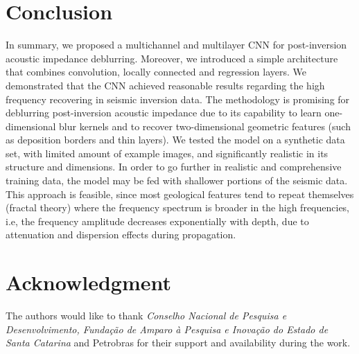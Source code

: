 \documentclass[journal]{IEEEtran}
\begin{document}
\section{Conclusion} \label{Conclusion}
In summary, we proposed a multichannel and multilayer CNN
for post-inversion acoustic impedance deblurring. Moreover, we introduced a simple architecture
that combines convolution, locally connected and regression layers.
We demonstrated that the CNN achieved reasonable results regarding the high frequency
recovering in seismic inversion data. The methodology is promising for deblurring
post-inversion acoustic impedance due to its capability to learn one-dimensional
blur kernels and to recover two-dimensional geometric features (such as deposition
borders and thin layers). We tested the model on a synthetic data set, with limited amount
of example images, and significantly realistic in its structure and dimensions. 
In order to go further in realistic and comprehensive training data, the model
may be fed with shallower portions of the seismic data. This approach is
feasible, since most geological features tend to repeat themselves
(fractal theory) where the frequency spectrum is broader in the high frequencies, i.e, the frequency
amplitude decreases exponentially with depth, due to attenuation and dispersion effects
during propagation.

\section*{Acknowledgment}

The authors would like to thank \textit{Conselho Nacional de Pesquisa e Desenvolvimento,
Fundação de Amparo à Pesquisa e Inovação do Estado de Santa Catarina} and Petrobras
for their support and availability during the work.

\ifCLASSOPTIONcaptionsoff
  \newpage
\fi
\end{document}
